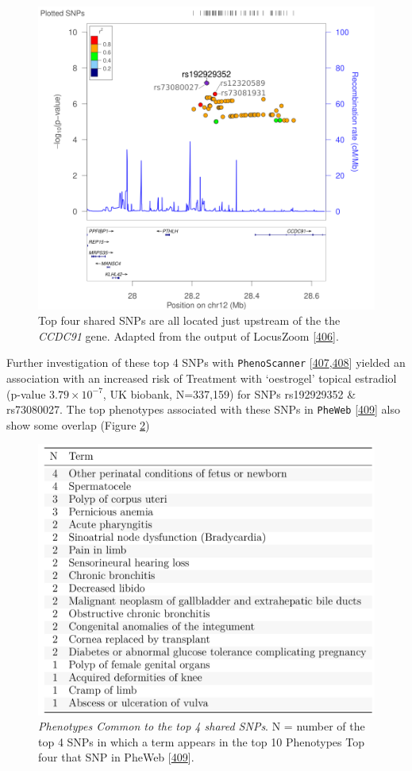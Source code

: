 \documentclass[
]{book}
\begin{document}
\begin{figure}

{\centering \includegraphics[width=0.7\linewidth]{./figs/locusZoom_rs192929352_400kb} 

}

\caption{Top four shared SNPs are all located just upstream of the the \emph{CCDC91} gene. Adapted from the output of LocusZoom {[}\protect\hyperlink{ref-Pruim2011}{406}{]}.}\label{fig:locusZoom}
\end{figure}



Further investigation of these top 4 SNPs with \texttt{PhenoScanner} {[}\protect\hyperlink{ref-Staley2016}{407},\protect\hyperlink{ref-Kamat2019}{408}{]} yielded an association with an increased risk of Treatment with `oestrogel' topical estradiol (p-value \(3.79\times10^{-7}\), UK biobank, N=337,159) for SNPs rs192929352 \& rs73080027.
The top phenotypes associated with these SNPs in \texttt{PheWeb} {[}\protect\hyperlink{ref-GaglianoTaliun2020}{409}{]} also show some overlap (Figure \ref{fig:PheWebSets})

\begin{figure}

{\centering \includegraphics[width=0.5\linewidth]{./figs/PheWeb_sets} 

}

\caption{\emph{Phenotypes Common to the top 4 shared SNPs}. N = number of the top 4 SNPs in which a term appears in the top 10 Phenotypes Top four that SNP in PheWeb {[}\protect\hyperlink{ref-GaglianoTaliun2020}{409}{]}.}\label{fig:PheWebSets}
\end{figure}
\end{document}
